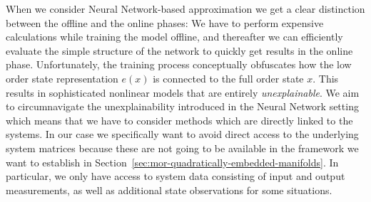 When we consider Neural Network-based approximation we get a clear distinction between the offline and the online phases: We have to perform expensive calculations while training the model offline, and thereafter we can efficiently evaluate the simple structure of the network to quickly get results in the online phase.
Unfortunately, the training process conceptually obfuscates how the low order state representation $e(x)$ is connected to the full order state $x$.
This results in sophisticated nonlinear models that are entirely \emph{unexplainable}.
We aim to circumnavigate the unexplainability introduced in the Neural Network setting which means that we have to consider methods which are directly linked to the systems.
In our case we specifically want to avoid direct access to the underlying system matrices because these are not going to be available in the framework we want to establish in Section~\ref{sec:mor-quadratically-embedded-manifolds}.
In particular, we only have access to system data consisting of input and output measurements, as well as additional state observations for some situations.
